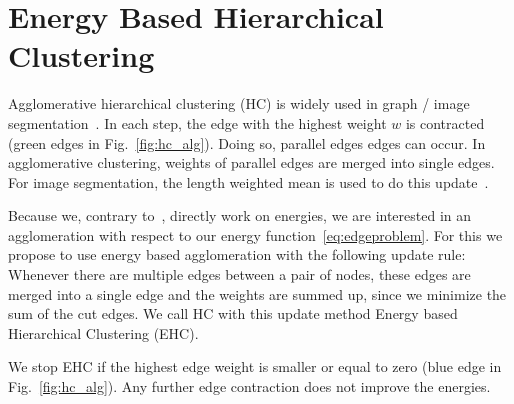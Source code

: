 \documentclass[10pt,twocolumn,letterpaper]{article}
\theoremstyle{definition}
\begin{document}

%
%


\section{Energy Based Hierarchical Clustering}\label{sec:ehc}
Agglomerative hierarchical clustering (HC) is widely used
in graph / image segmentation~\cite{arbelaez_2006}.
In each step, the edge with the highest weight $w$ is
contracted (green edges in Fig.~\ref{fig:hc_alg}).
Doing so, parallel edges edges can occur.
In agglomerative clustering, weights of
parallel edges are merged into single edges.
For image segmentation, the length
weighted mean is used to do this update~\cite{arbelaez_2006}.

Because we, contrary to~\cite{arbelaez_2006}, directly work on energies, we are interested in an 
agglomeration with respect to our energy function~\ref{eq:edgeproblem}.
For this we propose to use energy based agglomeration
with the following update rule:
Whenever there are multiple edges between 
a pair of nodes, these edges are merged into a single edge
and the weights are summed up, since we 
minimize the sum of the cut edges.
We call HC with this update method Energy based Hierarchical Clustering (EHC).

We stop EHC if the highest edge weight is
smaller or equal to zero  (blue edge in Fig.~\ref{fig:hc_alg}). Any further edge
contraction does not improve the energies.




\end{document}
